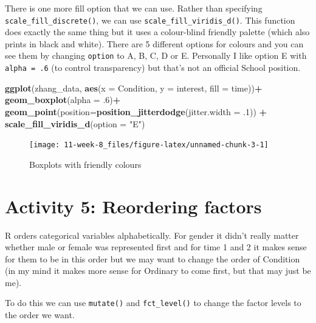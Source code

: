 \documentclass[]{book}
\newenvironment{Shaded}{\begin{snugshade}}{\end{snugshade}}
\newcommand{\DataTypeTok}[1]{\textcolor[rgb]{0.13,0.29,0.53}{#1}}
\newcommand{\FloatTok}[1]{\textcolor[rgb]{0.00,0.00,0.81}{#1}}
\newcommand{\KeywordTok}[1]{\textcolor[rgb]{0.13,0.29,0.53}{\textbf{#1}}}
\newcommand{\NormalTok}[1]{#1}
\newcommand{\OperatorTok}[1]{\textcolor[rgb]{0.81,0.36,0.00}{\textbf{#1}}}
\newcommand{\StringTok}[1]{\textcolor[rgb]{0.31,0.60,0.02}{#1}}
\begin{document}
There is one more fill option that we can use. Rather than specifying \texttt{scale\_fill\_discrete()}, we can use \texttt{scale\_fill\_viridis\_d()}. This function does exactly the same thing but it uses a colour-blind friendly palette (which also prints in black and white). There are 5 different options for colours and you can see them by changing \texttt{option} to A, B, C, D or E. Personally I like option E with \texttt{alpha\ =\ .6} (to control transparency) but that's not an official School position.

\begin{Shaded}
\begin{Highlighting}[]
\KeywordTok{ggplot}\NormalTok{(zhang_data, }\KeywordTok{aes}\NormalTok{(}\DataTypeTok{x =}\NormalTok{ Condition, }\DataTypeTok{y =}\NormalTok{ interest, }\DataTypeTok{fill =}\NormalTok{ time))}\OperatorTok{+}
\StringTok{  }\KeywordTok{geom_boxplot}\NormalTok{(}\DataTypeTok{alpha =} \FloatTok{.6}\NormalTok{)}\OperatorTok{+}
\StringTok{  }\KeywordTok{geom_point}\NormalTok{(}\DataTypeTok{position=}\KeywordTok{position_jitterdodge}\NormalTok{(}\DataTypeTok{jitter.width =} \FloatTok{.1}\NormalTok{)) }\OperatorTok{+}
\StringTok{  }\KeywordTok{scale_fill_viridis_d}\NormalTok{(}\DataTypeTok{option =} \StringTok{"E"}\NormalTok{)}
\end{Highlighting}
\end{Shaded}

\begin{figure}

{\centering \texttt{[image: 11-week-8\_files/figure-latex/unnamed-chunk-3-1]} 

}

\caption{Boxplots with friendly colours}\label{fig:unnamed-chunk-3}
\end{figure}

\hypertarget{activity-5-reordering-factors}{%
\section{Activity 5: Reordering factors}\label{activity-5-reordering-factors}}

R orders categorical variables alphabetically. For gender it didn't really matter whether male or female was represented first and for time 1 and 2 it makes sense for them to be in this order but we may want to change the order of Condition (in my mind it makes more sense for Ordinary to come first, but that may just be me).

To do this we can use \texttt{mutate()} and \texttt{fct\_level()} to change the factor levels to the order we want.
\end{document}
